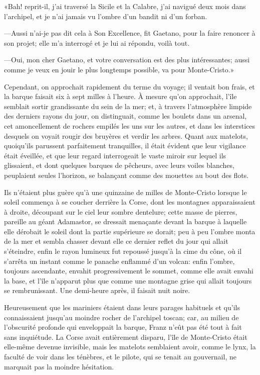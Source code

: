 «Bah! reprit-il, j'ai traversé la Sicile et la Calabre, j'ai navigué deux mois dans l'archipel, et je n'ai jamais vu l'ombre d'un bandit ni d'un forban.

—Aussi n'ai-je pas dit cela à Son Excellence, fit Gaetano, pour la faire renoncer à son projet; elle m'a interrogé et je lui ai répondu, voilà tout.

—Oui, mon cher Gaetano, et votre conversation est des plus intéressantes; aussi comme je veux en jouir le plus longtemps possible, va pour Monte-Cristo.»

Cependant, on approchait rapidement du terme du voyage; il ventait bon frais, et la barque faisait six à sept milles à l'heure. À mesure qu'on approchait, l'île semblait sortir grandissante du sein de la mer; et, à travers l'atmosphère limpide des derniers rayons du jour, on distinguait, comme les boulets dans un arsenal, cet amoncellement de rochers empilés les uns sur les autres, et dans les interstices desquels on voyait rougir des bruyères et verdir les arbres. Quant aux matelots, quoiqu'ils parussent parfaitement tranquilles, il était évident que leur vigilance était éveillée, et que leur regard interrogeait le vaste miroir sur lequel ils glissaient, et dont quelques barques de pêcheurs, avec leurs voiles blanches, peuplaient seules l'horizon, se balançant comme des mouettes au bout des flots.

Ils n'étaient plus guère qu'à une quinzaine de milles de Monte-Cristo lorsque le soleil commença à se coucher derrière la Corse, dont les montagnes apparaissaient à droite, découpant sur le ciel leur sombre dentelure; cette masse de pierres, pareille au géant Adamastor, se dressait menaçante devant la barque à laquelle elle dérobait le soleil dont la partie supérieure se dorait; peu à peu l'ombre monta de la mer et sembla chasser devant elle ce dernier reflet du jour qui allait s'éteindre, enfin le rayon lumineux fut repoussé jusqu'à la cime du cône, où il s'arrêta un instant comme le panache enflammé d'un volcan: enfin l'ombre, toujours ascendante, envahit progressivement le sommet, comme elle avait envahi la base, et l'île n'apparut plus que comme une montagne grise qui allait toujours se rembrunissant. Une demi-heure après, il faisait nuit noire.

Heureusement que les mariniers étaient dans leurs parages habituels et qu'ils connaissaient jusqu'au moindre rocher de l'archipel toscan; car, au milieu de l'obscurité profonde qui enveloppait la barque, Franz n'eût pas été tout à fait sans inquiétude. La Corse avait entièrement disparu, l'île de Monte-Cristo était elle-même devenue invisible, mais les matelots semblaient avoir, comme le lynx, la faculté de voir dans les ténèbres, et le pilote, qui se tenait au gouvernail, ne marquait pas la moindre hésitation.

